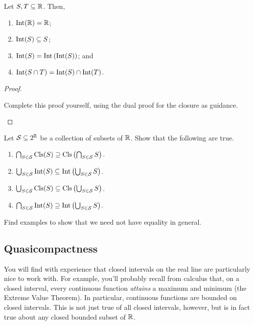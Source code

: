 \begin{thm}
Let $S,T\subseteq \mathbb{R}$.  Then,
\begin{enumerate}
\item $\operatorname{Int} (\mathbb{R} )=\mathbb{R}$;
\item $\operatorname{Int} (S)\subseteq S$;
\item $\operatorname{Int} (S)=\operatorname{Int} \left( \operatorname{Int} (S)\right)$; and
\item $\operatorname{Int} (S\cap T)=\operatorname{Int} (S)\cap \operatorname{Int} (T)$.
\end{enumerate}
\begin{proof}
\begin{exr}
Complete this proof yourself, using the dual proof for the closure as guidance.
\end{exr}
\end{proof}
\end{thm}
\begin{exr}\label{exr3.4.53}
Let $\mathcal{S}\subseteq 2^{\mathbb{R}}$ be a collection of subsets of $\mathbb{R}$.  Show that the following are true.
\begin{enumerate}
\item \label{enm3.4.53.i}$\bigcap _{S\in \mathcal{S}}\operatorname{Cls} (S)\supseteq \operatorname{Cls} \left( \bigcap _{S\in \mathcal{S}}S\right)$.
\item \label{enm3.4.53.ii}$\bigcup _{S\in \mathcal{S}}\operatorname{Int} (S)\subseteq \operatorname{Int} \left( \bigcup _{S\in \mathcal{S}}S\right) $.
\item \label{enm3.4.53.iii}$\bigcup _{S\in \mathcal{S}}\operatorname{Cls} (S)\subseteq \operatorname{Cls} \left( \bigcup _{S\in \mathcal{S}}S\right)$.
\item \label{enm3.4.53.iv}$\bigcap _{S\in \mathcal{S}}\operatorname{Int} (S)\supseteq \operatorname{Int} \left( \bigcup _{S\in \mathcal{S}}S\right)$.
\end{enumerate}
Find examples to show that we need not have equality in general.
\end{exr}

\subsection{Quasicompactness}

You will find with experience that closed intervals on the real line are particularly nice to work with.  For example, you'll probably recall from calculus that, on a closed interval, every continuous function \emph{attains} a maximum and minimum (the Extreme Value Theorem).  In particular, continuous functions are bounded on closed intervals.  This is not just true of all closed intervals, however, but is in fact true about any closed bounded subset of $\mathbb{R}$.

